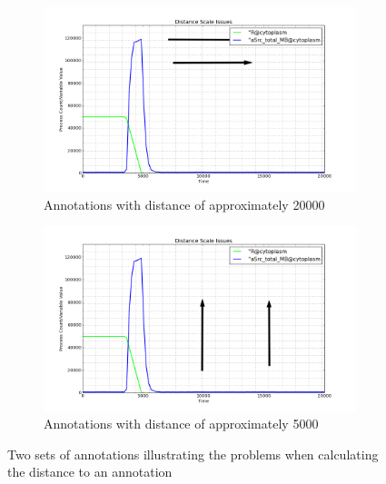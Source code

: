 \begin{figure}[h!]
    \centering
    \begin{subfigure}[b]{0.6\textwidth}
        \centering
        \includegraphics[width=\textwidth]{images/distance_scale_a.png}
        \caption{Annotations with distance of approximately 20000}
        \label{fig:distance_scale_a}
    \end{subfigure}

    \begin{subfigure}[b]{0.6\textwidth}
        \centering
        \includegraphics[width=\textwidth]{images/distance_scale_b.png}
        \caption{Annotations with distance of approximately 5000}
        \label{fig:distance_scale_b}
    \end{subfigure}
    \caption{Two sets of annotations illustrating the problems when calculating the distance to an annotation}
    \label{fig:distance_scale}
\end{figure}

